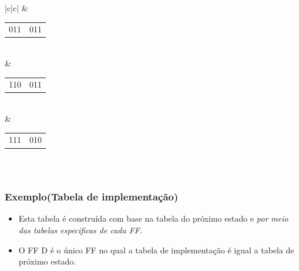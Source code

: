 \documentclass{beamer}
\begin{document}
\begin{frame}
\begin{columns}[c]
\begin{column}{7cm}
\begin{center}
\begin{tabular}{|c|c|}
	   \pause & \begin{tabular}{c|c} 011 \pause & 011 \pause\\ \end{tabular} \\
	   \pause & \begin{tabular}{c|c} 110 \pause & 011 \pause\\ \end{tabular} \\
	   \pause & \begin{tabular}{c|c} 111 \pause & 010 \pause\\ \end{tabular} \\
	  \hline
	\end{tabular}
      \end{center}
   \end{column}
  \end{columns}
\end{frame}

\begin{frame}
 \frametitle{Exemplo(Tabela de implementação)} 
  \begin{itemize}
   \item Esta tabela é construída com base na tabela do próximo estado e \emph{por meio das tabelas especificas de cada FF.}\pause
   \item O FF D é o único FF no qual a tabela de implementação é igual a tabela de próximo estado.
  \end{itemize}
\end{frame}
\end{document}
